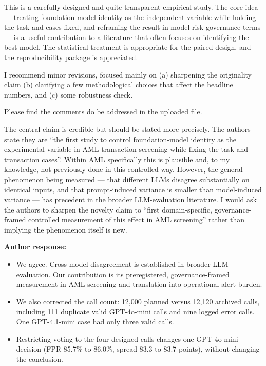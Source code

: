 \documentclass[11pt]{article}
\newcommand{\rvcomment}[1]{{\color{ReviewerGreen}#1}}
\begin{document}
\rvcomment{This is a carefully designed and quite transparent empirical study. The core idea --- treating foundation-model identity as the independent variable while holding the task and cases fixed, and reframing the result in model-risk-governance terms --- is a useful contribution to a literature that often focuses on identifying the best model. The statistical treatment is appropriate for the paired design, and the reproducibility package is appreciated.}

\rvcomment{I recommend minor revisions, focused mainly on (a) sharpening the originality claim (b) clarifying a few methodological choices that affect the headline numbers, and (c) some robustness check.}

\rvcomment{Please find the comments do be addressed in the uploaded file.}

\rvcomment{The central claim is credible but should be stated more precisely. The authors state they are ``the first study to control foundation-model identity as the experimental variable in AML transaction screening while fixing the task and transaction cases''. Within AML specifically this is plausible and, to my knowledge, not previously done in this controlled way. However, the general phenomenon being measured --- that different LLMs disagree substantially on identical inputs, and that prompt-induced variance is smaller than model-induced variance --- has precedent in the broader LLM-evaluation literature. I would ask the authors to sharpen the novelty claim to ``first domain-specific, governance-framed controlled measurement of this effect in AML screening'' rather than implying the phenomenon itself is new.}

\textbf{Author response:}

\begin{itemize}

\item We agree. Cross-model disagreement is established in broader LLM evaluation. Our contribution is its preregistered, governance-framed measurement in AML screening and translation into operational alert burden.

\item We also corrected the call count: 12,000 planned versus 12,120 archived calls, including 111 duplicate valid GPT-4o-mini calls and nine logged error calls. One GPT-4.1-mini case had only three valid calls.

\item Restricting voting to the four designed calls changes one GPT-4o-mini decision (FPR 85.7\% to 86.0\%, spread 83.3 to 83.7 points), without changing the conclusion.

\end{itemize}
\end{document}
